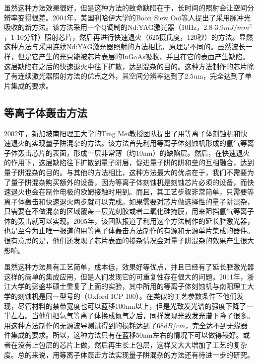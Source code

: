 \documentclass{ZJUthesis}
\begin{document}
虽然这种方法效果很好，但是这种方法的致命缺陷在于，长时间的照射会让空间分辨率变得很差。2004年，美国利哈伊大学的Boon Siew Ooi等人提出了采用脉冲光吸收的新方法\cite{ooi2004multiple}。该方法采用一个Q调制的Nd:YAG激光器（10Hz，2.8-3.9$mJ/mm^2$，1-10分钟）照射芯片，然后再进行快速退火（625摄氏度，120秒）的方法。显然这种方法与采用连续Nd:YAG激光器照射的方法相比，原理是不同的。虽然波长一样，但是它产生的光只能被芯片表层的InGaAs吸收，并且在它的表面产生缺陷。这层缺陷在之后的快速退火中往下扩散，达到混杂的目的。这种方法制作的芯片除了有连续激光器照射方法的优点之外，其空间分辨率达到了2.5um，完全达到了单片集成的要求。

\subsection{等离子体轰击方法}

2002年，新加坡南阳理工大学的Ting Mei教授团队提出了用等离子体刻蚀机和快速退火的实现量子阱混杂的方法\cite{djie2002high}。该方法首先利用等离子体刻蚀机形成的氩气等离子体轰击芯片的表面，形成一层非常薄（约10nm）的缺陷层。然后，在快速退火的作用下，这层缺陷往下扩散到量子阱层，促进量子阱的阱和垒的互相融合，达到量子阱混杂的目的。与其他的方法相比，这种方法最大的优点在于，我们不需要为了量子阱混杂购买额外的设备，因为等离子体刻蚀机是刻蚀芯片必须的设备，而快速退火也会在制作电极的欧姆接触时用到。而且，其工艺步骤非常简单，只需要等离子体轰击和快速退火两步就可以完成。如果需要对芯片做选择性的量子阱混杂，只需要在不做混杂的区域覆盖一层光刻胶或者二氧化硅掩膜，用来阻挡氩气等离子体的轰击就可以实现。2005年，该团队报道了利用这个方法制作的延长腔激光器\cite{djie2005plasma}，也是至今为止唯一报道的用等离子体轰击方法制作的有源和无源单片集成的器件。很有意思的是，他们还发现了芯片表面的掺杂情况会对量子阱混杂的效果产生很大影响\cite{xu2009inductively}。

虽然这种方法具有工艺简单，成本低，效果好等优点，并且已经有了延长腔激光器这样的简单的集成应用，但是人们发现它的可重复性存在很大的问题。2011年，浙江大学的彭盛华硕士重复了上面的实验\cite{peng2011argon}，其中所用的等离子体刻蚀机与南阳理工大学的刻蚀机是同一型号的（Oxford ICP 100）。在类似的工艺参数条件下他们发现，尽管材料的禁带宽度也可以蓝移100nm以上，但是光致发光谱的强度下降了一半左右。当他们把氩气等离子体换成氮气之后，同样发现光致发光谱下降了很多\cite{peng2009nitrogen-nitrogen}。用这种方法制作的无源波导测试得到的损耗达到了$68dB/cm$\cite{zhang2010optical-waveguide_test}，完全达不到无缘器件集成的要求。所以，这种方法只有在蓝移50nm左右的情况下可以做得较好。或者在没有上包层的芯片上做，然后再生长上包层，这样又大大增加了工艺的复杂度。总的来说，用等离子体轰击方法实现量子阱混杂的方法还有待进一步的研究。
\end{document}
